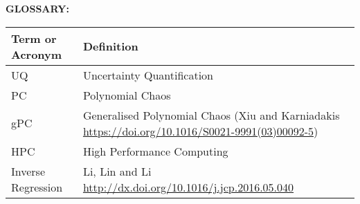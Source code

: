 \begin{table}[h]
\textbf{\textsf{GLOSSARY:}}
\begin{center}
\begin{tabular}{|p{4.0cm}|p{12.0cm}|}
\hline
\textbf{\textsf{Term or Acronym}}
& \textbf{\textsf{Definition}} \\
\hline
UQ & Uncertainty Quantification \\
\hline
PC & Polynomial Chaos \\
\hline
gPC & Generalised Polynomial Chaos (Xiu and Karniadakis \url{https://doi.org/10.1016/S0021-9991(03)00092-5}) \\
\hline
HPC & High Performance Computing \\
\hline
Inverse Regression & Li, Lin and Li \url{http://dx.doi.org/10.1016/j.jcp.2016.05.040} \\
\hline
\end{tabular}
\end{center}
\end{table}



